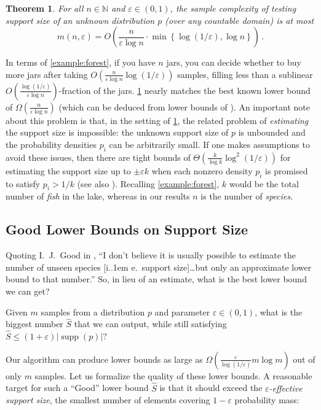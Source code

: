 \documentclass[10pt,a4paper]{article}
\newtheorem{theorem}{Theorem}[section]
\newcommand*\ie{i.\kern.1em e.\ }
\DeclareMathOperator{\supp}{supp}   %
\newcommand{\bN}{\ensuremath{\mathbb{N}}}
\renewcommand{\epsilon}{\varepsilon}
\begin{document}
\begin{theorem}
\label{res:intro-main}
For all $n \in \bN$ and $\epsilon \in (0,1)$, the sample complexity of testing support size of an
unknown distribution $p$ (over any countable domain) is at most
\[
  m(n,\epsilon) = O\left(\frac{n}{\epsilon \log n} \cdot \min\left\{ \log(1/\epsilon), \log n \right\} \right) \,.
\]
\end{theorem}

In terms of \cref{example:forest}, if you have $n$ jars, you can decide whether to buy more jars
after taking $O(\tfrac{n}{\epsilon \log n}\log(1/\epsilon))$ samples, filling
less than a sublinear $O(\tfrac{\log(1/\epsilon)}{\epsilon \log n})$-fraction of the jars.
\cref{res:intro-main} nearly matches the best known lower bound of $\Omega(\tfrac{n}{\epsilon \log
n})$ (which can be deduced from lower bounds of \cite{VV11stoc,WY19}). An important note about this
problem is that, in the setting of \cref{res:intro-main}, the related problem of \emph{estimating}
the support size is impossible: the unknown support size of $p$ is unbounded and the probability
densities $p_i$ can be arbitrarily small. If one makes assumptions to avoid these issues, then there
are tight bounds of $\Theta(\tfrac{k}{\log k} \log^2(1/\epsilon))$ for estimating the support size
up to $\pm \epsilon k$ when each nonzero density $p_i$ is promised to satisfy $p_i > 1/k$
\cite{WY19,HO19} (see also \cite{RRSS09,VV11stoc,ADOS17,VV17}). Recalling \cref{example:forest}, $k$
would be the total number of \emph{fish} in the lake, whereas in our results $n$ is the number of
\emph{species}.

\subsection{Good Lower Bounds on Support Size}
Quoting I.~J.~Good in \cite{BF93}, ``I don't believe it is usually possible to estimate the number
of unseen species [\ie support size]\dots but only an approximate lower bound to that number.'' So,
in lieu of an estimate, what is the best lower bound we can get?
\begin{question}
\label{question:good-lb}
Given $m$ samples from a distribution $p$ and parameter $\epsilon \in (0,1)$, what is the biggest
number $\widehat S$ that we can output, while still satisfying $\widehat S \leq
(1+\epsilon)|\supp(p)|$?
\end{question}
Our algorithm can produce lower bounds as large as $\Omega(\tfrac{\epsilon}{\log(1/\epsilon)} m \log
m)$ out of only $m$ samples. Let us formalize the quality of these lower bounds.  A reasonable
target for such a ``Good'' lower bound $\widehat S$ is that it should exceed the
\emph{$\epsilon$-effective support size}, the smallest number of elements covering $1-\epsilon$
probability mass:
\end{document}
